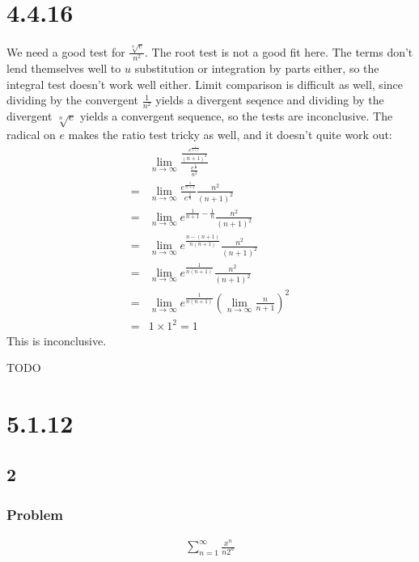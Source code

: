 \documentclass[12pt]{article}
\newcommand{\round}[1]{\left(       #1 \right)      }
\begin{document}
\section*{4.4.16}
We need a good test for $\frac{\sqrt[n]{e}}{n^2}$. The root test is not a good fit here. The terms don't lend themselves well to $u$ substitution or integration by parts either, so the integral test doesn't work well either. Limit comparison is difficult as well, since dividing by the convergent $\frac{1}{n^2}$ yields a divergent seqence and dividing by the divergent $\sqrt[n]{e}$ yields a convergent sequence, so the tests are inconclusive. The radical on $e$ makes the ratio test tricky as well, and it doesn't quite work out:
\begin{align*}
     & \lim_{n\to\infty} \frac{\frac{e^\frac{1}{n+1}}{(n+1)^2}} {\frac{e^\frac{1}{n}}{n^2}} \\
    =& \lim_{n\to\infty} \frac{e^\frac{1}{n+1}}{e^\frac{1}{n}} \frac{n^2}{(n+1)^2} \\
    =& \lim_{n\to\infty} e^{\frac{1}{n+1} - \frac{1}{n}} \frac{n^2}{(n+1)^2} \\
    =& \lim_{n\to\infty} e^{\frac{n-(n+1)}{n(n+1)}} \frac{n^2}{(n+1)^2} \\
    =& \lim_{n\to\infty} e^{\frac{1}{n(n+1)}} \frac{n^2}{(n+1)^2} \\
    =& \lim_{n\to\infty} e^{\frac{1}{n(n+1)}} \round{ \lim_{n\to\infty} \frac{n}{n+1}}^2 \\
    =& 1 \times 1^2 = 1
\end{align*}
This is inconclusive.

TODO



\section*{5.1.12}

\subsection*{2}
\subsubsection*{Problem}
\begin{align*}
    \sum_{n=1}^\infty \frac{x^n}{n2^n}
\end{align*}
\end{document}
